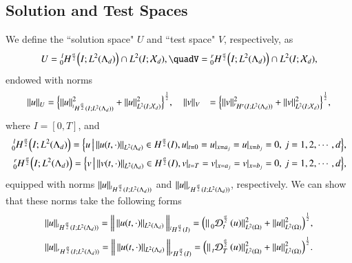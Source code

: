 \subsection*{\textbf{Solution and Test Spaces}}
%
We define the ``solution space" $U$ and ``test space" $V$, respectively, as
%
\begin{align}
%
\label{Eq: solution test space}
U  = \prescript{l}{0}H^{\frac{\alpha}{2}}\Big(I; L^2(\Lambda_d) \Big) \cap L^2(I; \mathcal{X}_d),
%
\quad%
V  = \prescript{r}{0}H^{\frac{\alpha}{2}}\Big(I; L^2(\Lambda_d)\Big) \cap L^2(I; \mathcal{X}_d),
%
\end{align}
%
endowed with norms
%
\begin{align}
%
\label{Eq: solution test space norm}
\Vert u \Vert_{U} &= 
\Big{\{}\Vert u \Vert_{\prescript{l}{}H^{\frac{\alpha}{2}}(I; L^2(\Lambda_d))}^2 + \Vert u \Vert_{L^2(I; \mathcal{X}_d)}^2 \Big{\}}^{\frac{1}{2}}, 
%
\quad
%
\Vert v \Vert_{V} &= 
\Big{\{}\Vert v \Vert_{\prescript{r}{}H^{\tau}(I; L^2(\Lambda_d))}^2  + \Vert v \Vert_{ L^2(I; \mathcal{X}_d)}^2 \Big{\}}^{\frac{1}{2}},
%
\end{align}
%
where $I = [0,T]$, and 
%
\begin{align*}
%
\prescript{l}{0}H^{\frac{\alpha}{2}} \Big(I; L^2(\Lambda_d) \Big) = 
\Big{\{} u \, \big|\, \Vert u(t,\cdot) \Vert_{L^2(\Lambda_d)} \in H^{\frac{\alpha}{2}}(I), u\vert_{t=0}=u\vert_{x=a_j}=u\vert_{x=b_j}=0,\, j=1,2,\cdots,d  \Big{\}},
%
\\
\prescript{r}{0}H^{\frac{\alpha}{2}} \Big(I; L^2(\Lambda_d) \Big) = 
\Big{\{} v \,\big|\, \Vert v(t,\cdot) \Vert_{L^2(\Lambda_d)} \in H^{\frac{\alpha}{2}}(I), v\vert_{t=T}=v\vert_{x=a_j}=v\vert_{x=b_j}=0,\, j =1,2,\cdots,d  \Big{\}},
%
\end{align*}
%
equipped with norms $\Vert u \Vert_{\prescript{l}{}H^{\frac{\alpha}{2}}(I; L^2(\Lambda_d))}$ and $\Vert u \Vert_{\prescript{r}{}H^{\frac{\alpha}{2}}(I; L^2(\Lambda_d))}$, respectively. We can show that these norms take the following forms
%
\begin{align}
%
\label{space norm 2}
&
\Vert u \Vert_{\prescript{l}{}H^{\frac{\alpha}{2}}(I; L^2(\Lambda_d))} = \Big{\Vert} \, \Vert u(t,\cdot) \Vert_{L^2(\Lambda_d)}\, \Big{\Vert}_{{^l}H^{\frac{\alpha}{2}}(I)}
=\Big(\Vert \prescript{}{0}{\mathcal{D}}_{t}^{\frac{\alpha}{2}}\, (u)\Vert_{L^2(\Omega)}^2 + \Vert u\Vert_{L^2(\Omega)}^2 \Big)^{\frac{1}{2}},
%
\\
&\Vert u \Vert_{\prescript{r}{}H^{\frac{\alpha}{2}}(I; L^2(\Lambda_d))} = \Big{\Vert} \, \Vert u(t,\cdot) \Vert_{L^2(\Lambda_d)}\, \Big{\Vert}_{{^r}H^{\frac{\alpha}{2}}(I)}
= \Big(\Vert \prescript{}{t}{\mathcal{D}}_{T}^{\frac{\alpha}{2}}\, (u)\Vert_{L^2(\Omega)}^2+\Vert u\Vert_{L^2(\Omega)}^2\Big)^{\frac{1}{2}}.
%
\end{align}
